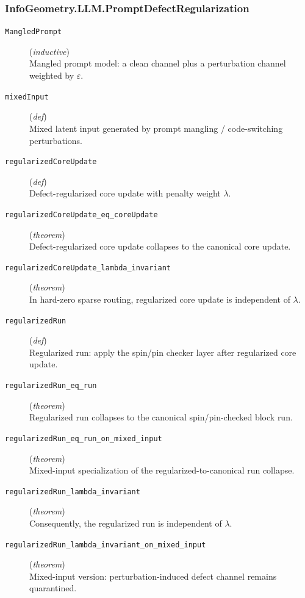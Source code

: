 \documentclass[11pt,a4paper]{article}
\begin{document}
\subsubsection*{InfoGeometry.LLM.PromptDefectRegularization}
\begin{description}
  \item[\texttt{MangledPrompt}] (\textit{inductive}) \\ Mangled prompt model: a clean channel plus a perturbation channel weighted by $\varepsilon $.
  \item[\texttt{mixedInput}] (\textit{def}) \\ Mixed latent input generated by prompt mangling / code-switching perturbations.
  \item[\texttt{regularizedCoreUpdate}] (\textit{def}) \\ Defect-regularized core update with penalty weight $\lambda $.
  \item[\texttt{regularizedCoreUpdate\_eq\_coreUpdate}] (\textit{theorem}) \\ Defect-regularized core update collapses to the canonical core update.
  \item[\texttt{regularizedCoreUpdate\_lambda\_invariant}] (\textit{theorem}) \\ In hard-zero sparse routing, regularized core update is independent of $\lambda $.
  \item[\texttt{regularizedRun}] (\textit{def}) \\ Regularized run: apply the spin/pin checker layer after regularized core update.
  \item[\texttt{regularizedRun\_eq\_run}] (\textit{theorem}) \\ Regularized run collapses to the canonical spin/pin-checked block run.
  \item[\texttt{regularizedRun\_eq\_run\_on\_mixed\_input}] (\textit{theorem}) \\ Mixed-input specialization of the regularized-to-canonical run collapse.
  \item[\texttt{regularizedRun\_lambda\_invariant}] (\textit{theorem}) \\ Consequently, the regularized run is independent of $\lambda $.
  \item[\texttt{regularizedRun\_lambda\_invariant\_on\_mixed\_input}] (\textit{theorem}) \\ Mixed-input version: perturbation-induced defect channel remains quarantined.
\end{description}
\end{document}
